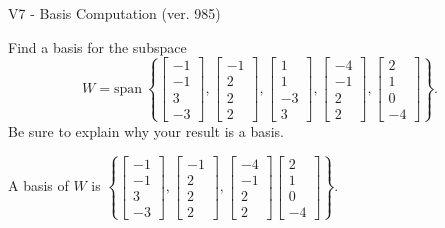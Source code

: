 \begin{exercise}
  \begin{exerciseTitle}V7 - Basis Computation (ver. 985)\end{exerciseTitle}
  \begin{exerciseStatement}
    Find a basis for the subspace 
\[W=\mathrm{span}\ \left\{\left[\begin{array}{r}
-1 \\
-1 \\
3 \\
-3
\end{array}\right] , \left[\begin{array}{r}
-1 \\
2 \\
2 \\
2
\end{array}\right] , \left[\begin{array}{r}
1 \\
1 \\
-3 \\
3
\end{array}\right] , \left[\begin{array}{r}
-4 \\
-1 \\
2 \\
2
\end{array}\right] , \left[\begin{array}{r}
2 \\
1 \\
0 \\
-4
\end{array}\right]\right\}.\]
 Be sure to explain why your result is a basis.


  \end{exerciseStatement}
  \begin{exerciseAnswer}
   A basis of \(W\) is  \(\left\{\left[\begin{array}{r}
-1 \\
-1 \\
3 \\
-3
\end{array}\right] , \left[\begin{array}{r}
-1 \\
2 \\
2 \\
2
\end{array}\right] , \left[\begin{array}{r}
-4 \\
-1 \\
2 \\
2
\end{array}\right] \left[\begin{array}{r}
2 \\
1 \\
0 \\
-4
\end{array}\right]\right\}\).
  


  \end{exerciseAnswer}
\end{exercise}